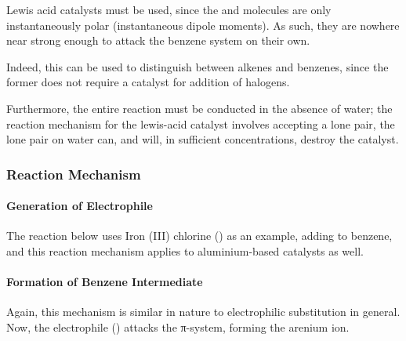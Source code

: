 				Lewis acid catalysts must be used, since the  and \ch{\Cl-\Cl} molecules are only instantaneously
				polar (instantaneous dipole moments). As such, they are nowhere near strong enough to attack the benzene system on their own.

				Indeed, this can be used to distinguish between alkenes and benzenes, since the former does not require a catalyst for addition
				of halogens.

				Furthermore, the entire reaction must be conducted in the absence of water; the reaction mechanism for the lewis-acid catalyst
				involves accepting a lone pair, the lone pair on water can, and will, in sufficient concentrations, destroy the catalyst.




			\subsubsection{Reaction Mechanism}

				\paragraph{Generation of Electrophile}

				The reaction below uses Iron (III) chlorine () as an example, adding \ch{\Cl} to benzene,
				and this reaction mechanism applies to aluminium-based catalysts as well.



				\pagebreak

				\paragraph{Formation of Benzene Intermediate}

				Again, this mechanism is similar in nature to electrophilic substitution in general. Now, the electrophile () attacks
				the π-system, forming the arenium ion.




